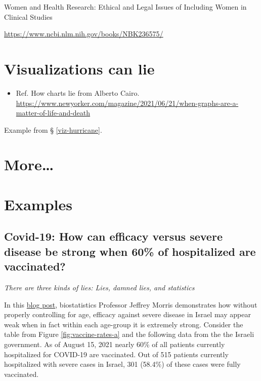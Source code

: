 \documentclass[
]{book}
\providecommand{\tightlist}{%
  \setlength{\itemsep}{0pt}\setlength{\parskip}{0pt}}
\newenvironment{rnote}{\par\raggedleft}{\par}
\begin{document}
Women and Health Research: Ethical and Legal Issues of Including Women in Clinical Studies

\url{https://www.ncbi.nlm.nih.gov/books/NBK236575/}

\hypertarget{visualizations-can-lie}{%
\section{Visualizations can lie}\label{visualizations-can-lie}}

\begin{itemize}
\tightlist
\item
  Ref. How charts lie from Alberto Cairo. \url{https://www.newyorker.com/magazine/2021/06/21/when-graphs-are-a-matter-of-life-and-death}
\end{itemize}

Example from § \ref{viz-hurricane}.

\hypertarget{more}{%
\section{More\ldots{}}\label{more}}

\hypertarget{examples-3}{%
\section{Examples}\label{examples-3}}

\hypertarget{covid-israel}{%
\subsection{Covid-19: How can efficacy versus severe disease be strong when 60\% of hospitalized are vaccinated?}\label{covid-israel}}

\begin{rnote}
\emph{There are three kinds of lies: Lies, damned lies, and statistics}

\end{rnote}

In this \href{https://www.covid-datascience.com/post/israeli-data-how-can-efficacy-vs-severe-disease-be-strong-when-60-of-hospitalized-are-vaccinated}{blog post}, biostatistics Professor Jeffrey Morris demonstrates how without properly controlling for age, efficacy against severe disease in Israel may appear weak when in fact within each age-group it is extremely strong. Consider the table from Figure \ref{fig:vaccine-rates-a} and the following data from the the Israeli government. As of August 15, 2021 nearly 60\% of all patients currently hospitalized for COVID-19 are vaccinated. Out of 515 patients currently hospitalized with severe cases in Israel, 301 (58.4\%) of these cases were fully vaccinated.
\end{document}
